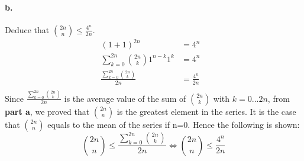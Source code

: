 \documentclass{article}
\begin{document}
		\paragraph{b. }Deduce that ${2n \choose n} \le \frac{4^n}{2n}$.
		\begin{align*}
			(1+1)^{2n} &= 4^n &\\
			\sum_{k=0}^{2n}{2n \choose k}1^{n-k}1^k &= 4^n &\\
			\frac{\sum_{k=0}^{2n}{2n \choose k}}{2n} &= \frac{4^n}{2n} &\\
		\end{align*}
		Since $\frac{\sum_{k=0}^{2n}{2n \choose k}}{2n}$ is the average value of the
		sum of $2n \choose k$ with $k=0 \dots 2n$, from \textbf{part a}, we proved that $2n
		\choose n$ is the greatest element in the series. It is the case that $2n
		\choose n$ equals to the mean of the series if n=0. Hence the following is shown: 
		$${2n \choose n} \leq \frac{\sum_{k=0}^{2n}{2n \choose k}}{2n} \Leftrightarrow 
		{2n \choose n} \leq \frac{4^n}{2n}$$
		
\end{document}
